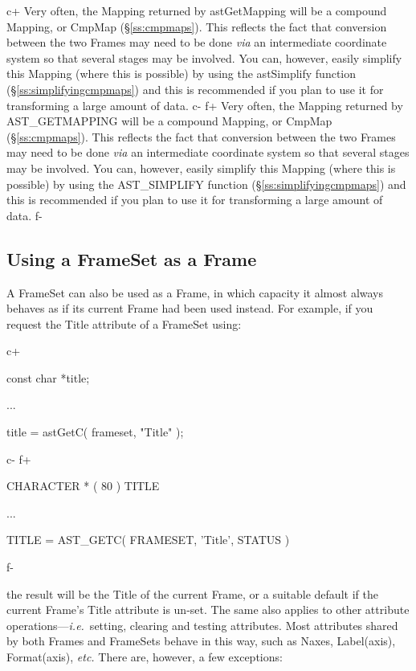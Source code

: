 \documentclass[twoside,11pt]{starlink}
\providecommand{\secref}[1]{\S\ref{#1}}
\begin{document}
{c+
Very often, the Mapping returned by astGetMapping will be a compound
Mapping, or CmpMap (\secref{ss:cmpmaps}). This reflects the fact that
conversion between the two Frames may need to be done \emph{via} an
intermediate coordinate system so that several stages may be involved.
You can, however, easily simplify this Mapping (where this is possible)
by using the astSimplify function (\secref{ss:simplifyingcmpmaps}) and
this is recommended if you plan to use it for transforming a large
amount of data.
c-
f+
Very often, the Mapping returned by AST\_GETMAPPING will be a compound
Mapping, or CmpMap (\secref{ss:cmpmaps}). This reflects the fact that
conversion between the two Frames may need to be done \emph{via} an
intermediate coordinate system so that several stages may be involved.
You can, however, easily simplify this Mapping (where this is possible)
by using the AST\_SIMPLIFY function (\secref{ss:simplifyingcmpmaps})
and this is recommended if you plan to use it for transforming a large
amount of data.
f-

\subsection{\label{ss:framesetasframe}Using a FrameSet as a Frame}

A FrameSet can also be used as a Frame, in which capacity it almost
always behaves as if its current Frame had been used instead. For
example, if you request the Title attribute of a FrameSet using:

c+
\small
\begin{terminalv}
const char *title;

...

title = astGetC( frameset, "Title" );
\end{terminalv}
\normalsize
c-
f+
\small
\begin{terminalv}
      CHARACTER * ( 80 ) TITLE

      ...

      TITLE = AST_GETC( FRAMESET, 'Title', STATUS )
\end{terminalv}
\normalsize
f-

the result will be the Title of the current Frame, or a suitable
default if the current Frame's Title attribute is un-set. The same
also applies to other attribute operations---\emph{i.e.}\ setting,
clearing and testing attributes.  Most attributes shared by both
Frames and FrameSets behave in this way, such as Naxes, Label(axis),
Format(axis), \emph{etc.} There are, however, a few exceptions:

}
\end{document}

